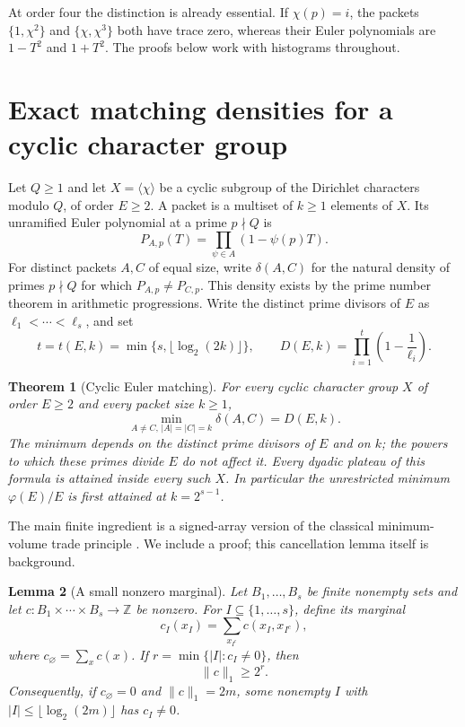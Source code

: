 \documentclass[11pt]{article}
\newtheorem{theorem}{Theorem}[section]
\newtheorem{lemma}[theorem]{Lemma}
\theoremstyle{definition}
\theoremstyle{remark}
\begin{document}
At order four the distinction is already essential. If $\chi(p)=i$, the packets $\{1,\chi^2\}$ and $\{\chi,\chi^3\}$ both have trace zero, whereas their Euler polynomials are $1-T^2$ and $1+T^2$. The proofs below work with histograms throughout.

\section{Exact matching densities for a cyclic character group}

Let $Q\ge 1$ and let $X=\langle\chi\rangle$ be a cyclic subgroup of the
Dirichlet characters modulo $Q$, of order $E\ge2$.  A packet is a multiset
of $k\ge1$ elements of $X$.  Its unramified Euler polynomial at a prime
$p\nmid Q$ is
\[
 P_{A,p}(T)=\prod_{\psi\in A}(1-\psi(p)T).
\]
For distinct packets $A,C$ of equal size, write $\delta(A,C)$ for the
natural density of primes $p\nmid Q$ for which $P_{A,p}\ne P_{C,p}$.
This density exists by the prime number theorem in arithmetic progressions.
Write the distinct prime divisors of $E$ as
$\ell_1<\cdots<\ell_s$, and set
\[
 t=t(E,k)=\min\{s,\lfloor\log_2(2k)\rfloor\},\qquad
 D(E,k)=\prod_{i=1}^{t}\left(1-\frac1{\ell_i}\right).
\]

\begin{theorem}[Cyclic Euler matching]\label{thm:cyclic-euler}
For every cyclic character group $X$ of order $E\ge2$ and every packet
size $k\ge1$,
\[
 \min_{A\ne C,\,|A|=|C|=k}\delta(A,C)=D(E,k).
\]
The minimum depends on the distinct prime divisors of $E$ and on $k$;
the powers to which these primes divide $E$ do not affect it.  Every
dyadic plateau of this formula is attained inside every such $X$.
In particular the unrestricted minimum $\varphi(E)/E$ is first attained
at $k=2^{s-1}$.
\end{theorem}

The main finite ingredient is a signed-array version of the classical minimum-volume trade principle \cite{trades}. We include a proof; this cancellation lemma itself is background.

\begin{lemma}[A small nonzero marginal]\label{lem:small-marginal}
Let $B_1,\ldots,B_s$ be finite nonempty sets and let
$c:B_1\times\cdots\times B_s\to\mathbb Z$ be nonzero.  For
$I\subseteq\{1,\ldots,s\}$, define its marginal
\[
 c_I(x_I)=\sum_{x_{I^c}}c(x_I,x_{I^c}),
\]
where $c_\varnothing=\sum_xc(x)$.  If
$r=\min\{|I|:c_I\ne0\}$, then
\[
 \|c\|_1\ge2^r.
\]
Consequently, if $c_\varnothing=0$ and $\|c\|_1=2m$, some nonempty
$I$ with $|I|\le\lfloor\log_2(2m)\rfloor$ has $c_I\ne0$.
\end{lemma}
\end{document}
